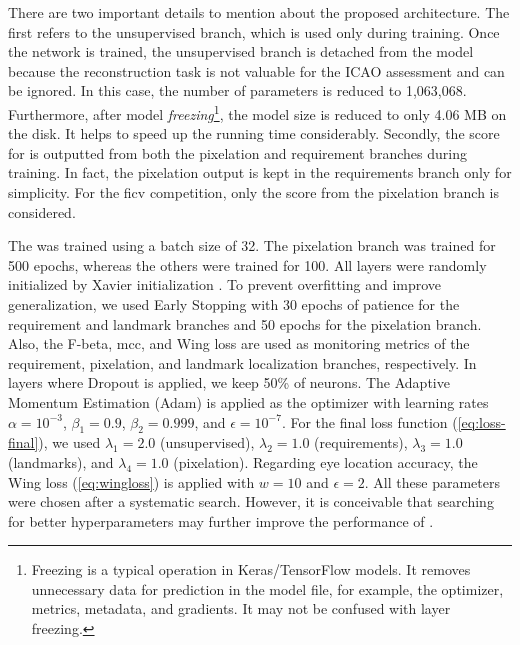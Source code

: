There are two important details to mention about the proposed architecture. The first refers to the unsupervised branch, which is used only during training. Once the network is trained, the unsupervised branch is detached from the model because the reconstruction task is not valuable for the ICAO assessment and can be ignored. In this case, the number of parameters is reduced to 1,063,068. Furthermore, after model \textit{freezing}\footnote{Freezing is a typical operation in Keras/TensorFlow models. It removes unnecessary data for prediction in the model file, for example, the optimizer, metrics, metadata, and gradients. It may not be confused with layer freezing.}, the model size is reduced to only 4.06 MB on the disk. It helps to speed up the running time considerably. Secondly, the score for \pixelation is outputted from both the pixelation and requirement branches during training. In fact, the pixelation output is kept in the requirements branch only for simplicity. For the \acs{ficv} competition, only the score from the pixelation branch is considered.
 
The \methodname was trained using a batch size of 32. The pixelation branch was trained for 500 epochs, whereas the others were trained for 100. All layers were randomly initialized by Xavier initialization \citep{glorot2010understanding}. To prevent overfitting and improve generalization, we used Early Stopping with 30 epochs of patience for the requirement and landmark branches and 50 epochs for the pixelation branch. Also, the F-beta, \acs{mcc}, and Wing loss are used as monitoring metrics of the requirement, pixelation, and landmark localization branches, respectively. In layers where Dropout is applied, we keep 50\% of neurons. The Adaptive Momentum Estimation (Adam) is applied as the optimizer with learning rates $\alpha=10^{-3}$, $\beta_1=0.9$, $\beta_2=0.999$, and $\epsilon=10^{-7}$. For the final loss function (\autoref{eq:loss-final}), we used $\lambda_1=2.0$ (unsupervised), $\lambda_2=1.0$ (requirements), $\lambda_3=1.0$ (landmarks), and $\lambda_4=1.0$ (pixelation). Regarding eye location accuracy, the Wing loss (\autoref{eq:wingloss}) is applied with $w = 10$ and $\epsilon = 2$. All these parameters were chosen after a systematic search. However, it is conceivable that searching for better hyperparameters may further improve the performance of \methodname.
 
 
 